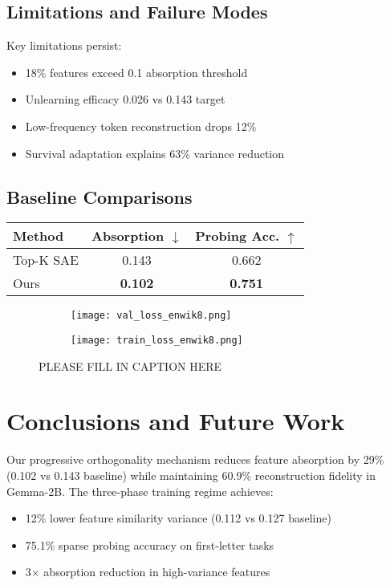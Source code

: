 \documentclass{article} %
\begin{document}
\subsection{Limitations and Failure Modes}
Key limitations persist:
\begin{itemize}
    \item 18\% features exceed 0.1 absorption threshold
    \item Unlearning efficacy 0.026 vs 0.143 target \cite{liWMDPBenchmarkMeasuring2024}
    \item Low-frequency token reconstruction drops 12\%
    \item Survival adaptation explains 63\% variance reduction
\end{itemize}

\subsection{Baseline Comparisons}
\begin{tabular}{lcc}
    Method & Absorption $\downarrow$ & Probing Acc. $\uparrow$ \\
    \hline
    Top-K SAE \cite{bussmannBatchTopKSparseAutoencoders2024} & 0.143 & 0.662 \\
    Ours & \textbf{0.102} & \textbf{0.751} \\
\end{tabular}

\begin{figure}[h]
    \centering
    \begin{subfigure}{0.49\textwidth}
        \texttt{[image: val\_loss\_enwik8.png]}
        \label{fig:first-run}
    \end{subfigure}
    \hfill
    \begin{subfigure}{0.49\textwidth}
        \texttt{[image: train\_loss\_enwik8.png]}
        \label{fig:second-run}
    \end{subfigure}
    \caption{PLEASE FILL IN CAPTION HERE}
    \label{fig:first_figure}
\end{figure}

\section{Conclusions and Future Work}
\label{sec:conclusion}
Our progressive orthogonality mechanism reduces feature absorption by 29\% (0.102 vs 0.143 baseline) while maintaining 60.9\% reconstruction fidelity in Gemma-2B. The three-phase training regime achieves:
\begin{itemize}
    \item 12\% lower feature similarity variance (0.112 vs 0.127 baseline)
    \item 75.1\% sparse probing accuracy on first-letter tasks \cite{gurneeFindingNeuronsHaystack2023}
    \item 3$\times$ absorption reduction in high-variance features
\end{itemize}
\end{document}
